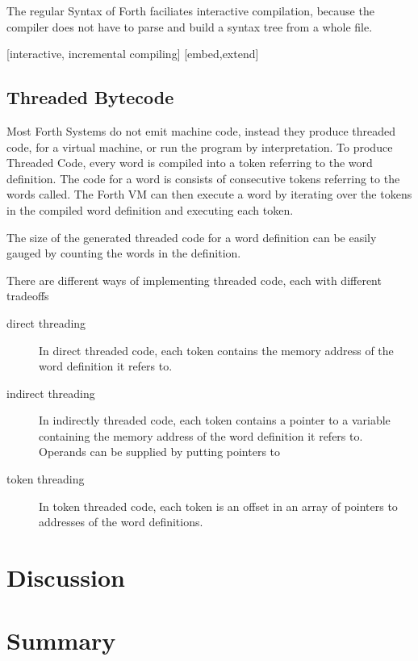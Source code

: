 \documentclass{llncs}
\begin{document}
The regular Syntax of Forth faciliates interactive compilation, because the compiler does not have to parse and build a syntax tree from a whole file.

[interactive, incremental compiling]
[embed,extend]


\subsection{Threaded Bytecode}

Most Forth Systems do not emit machine code, instead they produce threaded code, for a virtual machine, or run the program by interpretation.
To produce Threaded Code, every word is compiled into a token referring to the word definition.
The code for a word is consists of consecutive tokens referring to the words called.
The Forth VM can then execute a word by iterating over the tokens in the compiled word definition and executing each token.

The size of the generated threaded code for a word definition can be easily gauged by counting the words in the definition.

There are different ways of implementing threaded code, each with different tradeoffs

\begin{description}
\item[direct threading] 
  In direct threaded code, each token contains the memory address of the word definition it refers to. 
\item[indirect threading] 
  In indirectly threaded code, each token contains a pointer to a variable containing the memory address of the word definition it refers to. Operands can be supplied by putting pointers to 
\item[token threading] 
  In token threaded code, each token is an offset in an array of pointers to addresses of the word definitions.
\end{description}
 
\section{Discussion}

\section{Summary}

{}
\end{document}
